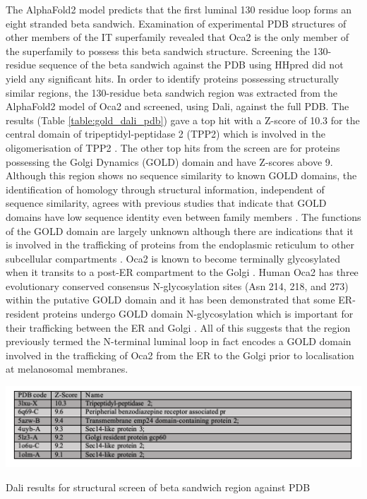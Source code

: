 The AlphaFold2 model predicts that the first luminal 130 residue loop forms an eight stranded beta sandwich. Examination of experimental PDB structures of other members of the IT superfamily revealed that Oca2 is the only member of the superfamily to possess this beta sandwich structure. Screening the 130-residue sequence of the beta sandwich against the PDB using HHpred did not yield any significant hits. In order to identify proteins possessing structurally similar regions, the 130-residue beta sandwich region was extracted from the AlphaFold2 model of Oca2 and screened, using Dali, against the full PDB. The results (Table \ref{table:gold_dali_pdb}) gave a top hit with a Z-score of 10.3 for the central domain of tripeptidyl-peptidase 2 (TPP2) which is involved in the oligomerisation of TPP2 \cite{schonegge2012structure}. The other top hits from the screen are for proteins possessing the Golgi Dynamics (GOLD) domain and have Z-scores above 9. Although this region shows no sequence similarity to known GOLD domains, the identification of homology through structural information, independent of sequence similarity, agrees with previous studies that indicate that GOLD domains have low sequence identity even between family members \cite{nagae20163d}.
The functions of the GOLD domain are largely unknown although there are indications that  it is involved in the trafficking of proteins from the endoplasmic reticulum to other subcellular compartments \cite{nagae20163d}. Oca2 is known to become terminally glycosylated when it transits to a post-ER compartment to the Golgi \cite{sitaram2009localization}. Human Oca2 has three evolutionary conserved consensus N-glycosylation sites (Asn 214, 218, and 273) \cite{sitaram2009localization} within the putative GOLD domain \cite{sitaram2009localization} and it has been demonstrated that some ER-resident proteins undergo GOLD domain N-glycosylation which is important for their trafficking between the ER and Golgi \cite{pastor2017n}. All of this suggests that the region previously termed the N-terminal luminal loop in fact encodes a GOLD domain involved in the trafficking of Oca2 from the ER to the Golgi prior to localisation at melanosomal membranes.


\begin{table}[th!]
    \centering
    \includegraphics[width=150mm, scale=0.75]{oca2/table_5.png}
    \caption{Dali results for structural screen of beta sandwich region against PDB}
    \label{table:gold_dali_pdb}
\small
\end{table}




